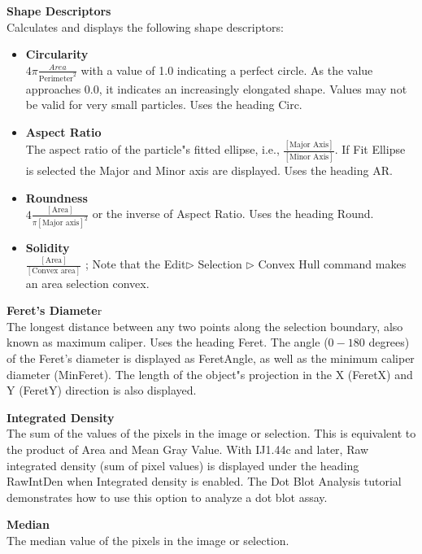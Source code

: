 \textbf{Shape Descriptors}\\Calculates and displays the following
shape descriptors:

\begin{itemize}
\item \textbf{Circularity}\\$4\pi\frac{Area}{\text{Perimeter}^{2}}$ with
a value of 1.0 indicating a perfect circle. As the value approaches
0.0, it indicates an increasingly elongated shape. Values may not be
valid for very small particles. Uses the heading Circ.

\item \textbf{Aspect Ratio}\\The aspect ratio of the
particle"s fitted ellipse, i.e., $\frac{[\text{Major Axis}]}{[\text{Minor
Axis}]}$. If Fit Ellipse is selected the Major and Minor axis are
displayed. Uses the heading AR.

\item \textbf{Roundness}\\$4\frac{[\text{Area}]}{\pi [\text{Major axis}]^{2}}$ or the inverse
of Aspect Ratio. Uses the heading Round.
\item \textbf{Solidity}\\$\frac{[\text{Area}]}{[\text{Convex area}]}$ ; 
Note that the 
Edit${\triangleright}$ Selection ${\triangleright}$ Convex Hull 
command makes an area selection convex.

\end{itemize}

\textbf{Feret's Diamete}r\\The longest distance
between any two points along the selection boundary, also known as
maximum caliper. Uses the heading Feret. The angle ($0-180$ degrees)
of the Feret's diameter is displayed as FeretAngle, as
well as the minimum caliper diameter (MinFeret). The length of the
object"s projection in the X (FeretX) and Y (FeretY)
direction is also displayed.

\textbf{Integrated Density}\\The sum of the values of the pixels in
the image or selection. This is equivalent to the product of Area and
Mean Gray Value. With IJ1.44c and later, Raw integrated
density (sum of pixel values) is displayed under the heading RawIntDen
when Integrated density is enabled. The Dot Blot Analysis tutorial
demonstrates how to use this option to analyze a dot blot assay.

\textbf{Median}\\The median value of the pixels in the image or
selection.

